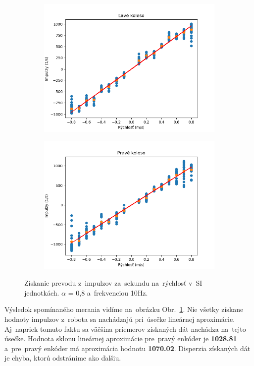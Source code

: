 \clearpage

\begin{figure}[!htbp]
	\begin{subfigure}{0.5\textwidth}
		\includegraphics[width=\textwidth]{img/lw_08100.png}
	\end{subfigure}
	\hfill
	\begin{subfigure}{0.5\textwidth}
		\includegraphics[width=\textwidth]{img/rw_08100.png}
	\end{subfigure}
	\caption{Získanie prevodu z~impulzov za~sekundu na~rýchlosť v~SI jednotkách. $\alpha$ = 0,8 a~frekvenciou 10Hz.}
	\label{fig:rw_lw_08100}
\end{figure}

Výsledok spomínaného merania vidíme na~obrázku Obr.~\ref{fig:rw_lw_08100}. Nie všetky získane hodnoty impulzov
z~robota sa nachádzajú pri~úsečke lineárnej aproximácie. Aj~napriek tomuto faktu sa väčšina priemerov získaných
dát nachádza na~tejto úsečke. Hodnota sklonu lineárnej aproximácie pre~pravý enkóder je \textbf{1028.81} a~pre~pravý
enkóder má aproximácia hodnotu \textbf{1070.02}. Disperzia získaných dát je chyba, ktorú odstránime ako ďalšiu.

